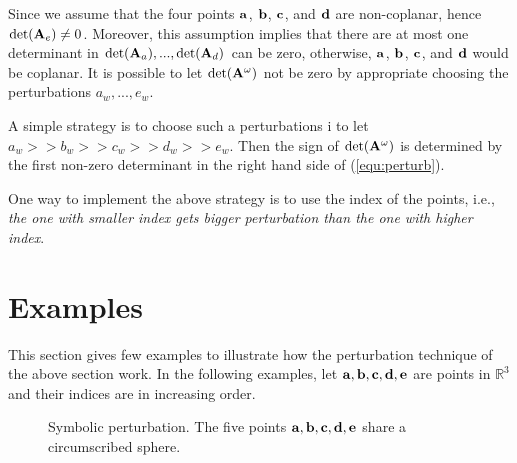 Since we assume that the four points ${\bf a}$, ${\bf b}$, ${\bf c}$, and ${\bf d}$ are non-coplanar, hence $\textrm{det}({\bf A}_e) \neq 0$. Moreover, this assumption implies that there are at most one determinant in $\textrm{det}({\bf A}_a), ..., \textrm{det}({\bf A}_d)$ can be zero, otherwise, ${\bf a}$, ${\bf b}$, ${\bf c}$, and ${\bf d}$ would be coplanar. It is possible to let $\textrm{det}({\bf A}^{\omega})$ not be zero by appropriate choosing the perturbations $a_w, ..., e_w$.

A simple strategy is to choose such a perturbations i to let $a_w >> b_w >> c_w >> d_w >> e_w$. Then the sign of $\textrm{det}({\bf A}^{\omega})$ is determined by the first non-zero determinant in the right hand side of (\ref{equ:perturb}).

One way to implement the above strategy is to use the index of the points, i.e., {\it the one with smaller index gets bigger perturbation than the one with higher index}.

\section{Examples}

This section gives few examples to illustrate how the perturbation technique of the above section work.  In the following examples, let ${\bf a}, {\bf b}, {\bf c}, {\bf d}, {\bf e}$ are points in $\mathbb{R}^3$ and their indices are in increasing order.

\begin{figure}
\caption{Symbolic perturbation. The five points ${\bf a}, {\bf b}, {\bf c}, {\bf d}, {\bf e}$ share a circumscribed sphere.}
\label{fig:ex1}
\end{figure}

